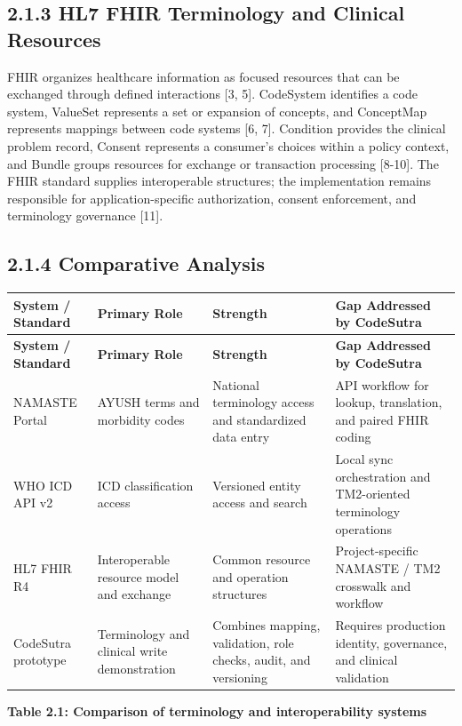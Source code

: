 \documentclass[12pt,a4paper,oneside]{report}
\begin{document}
\subsection*{2.1.3 HL7 FHIR Terminology and Clinical Resources}
FHIR organizes healthcare information as focused resources that can be exchanged through defined interactions [3, 5]. CodeSystem identifies a code system, ValueSet represents a set or expansion of concepts, and ConceptMap represents mappings between code systems [6, 7]. Condition provides the clinical problem record, Consent represents a consumer's choices within a policy context, and Bundle groups resources for exchange or transaction processing [8-10]. The FHIR standard supplies interoperable structures; the implementation remains responsible for application-specific authorization, consent enforcement, and terminology governance [11].

\subsection*{2.1.4 Comparative Analysis}
\begin{longtable}{|p{}|p{}|p{}|p{}|}
\hline
\textbf{System / Standard} & \textbf{Primary Role} & \textbf{Strength} & \textbf{Gap Addressed by CodeSutra} \\ \hline
\endfirsthead
\hline \textbf{System / Standard} & \textbf{Primary Role} & \textbf{Strength} & \textbf{Gap Addressed by CodeSutra} \\ \hline\endhead
NAMASTE Portal & AYUSH terms and morbidity codes & National terminology access and standardized data entry & API workflow for lookup, translation, and paired FHIR coding \\ \hline
WHO ICD API v2 & ICD classification access & Versioned entity access and search & Local sync orchestration and TM2-oriented terminology operations \\ \hline
HL7 FHIR R4 & Interoperable resource model and exchange & Common resource and operation structures & Project-specific NAMASTE / TM2 crosswalk and workflow \\ \hline
CodeSutra prototype & Terminology and clinical write demonstration & Combines mapping, validation, role checks, audit, and versioning & Requires production identity, governance, and clinical validation \\ \hline
\end{longtable}
\vspace{4pt}
\smallskip\textbf{\textbf{Table 2.1: Comparison of terminology and interoperability systems}}\
\end{document}
